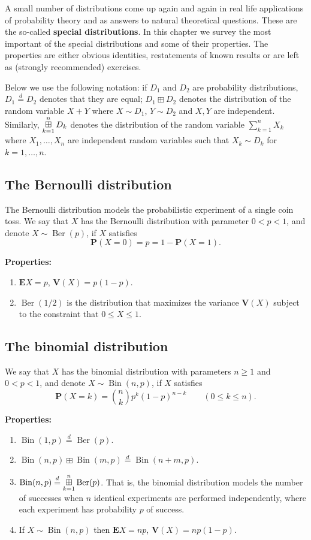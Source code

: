 \documentclass[12pt]{article}
\newcommand{\prob}{\mathbf{P}}
\newcommand{\expec}{\mathbf{E}}
\newcommand{\var}{\mathbf{V}}
\newcommand{\eqdist}{\stackrel{d}{=}}
\newcommand{\indplus}{\boxplus}
\newcommand{\indsum}{\displaystyle \mathop{\boxplus}\displaylimits}
\newcommand{\berdist}{\operatorname{Ber}}
\newcommand{\bindist}{\operatorname{Bin}}
\theoremstyle{example}
\begin{document}
A small number of distributions come up again and again in real life applications of probability theory and as answers to natural theoretical questions. These are the so-called \textbf{special distributions}. In this chapter we survey the most important of the special distributions and some of their properties. The properties are either obvious identities, restatements of known results or are left as  (strongly recommended) exercises.

Below we use the following notation: if $D_1$ and $D_2$ are probability distributions, $D_1 \eqdist D_2$ denotes that they are equal; $D_1\indplus D_2$ denotes the distribution of the random variable $X+Y$ where $X\sim D_1$, $Y\sim D_2$ and $X,Y$ are independent. Similarly, $\indsum_{k=1}^n D_k$ denotes the distribution of the random variable $\sum_{k=1}^n X_k$ where $X_1,\ldots,X_n$ are independent random variables such that $X_k \sim D_k$ for $k=1,\ldots,n$.

\subsection{The Bernoulli distribution}

The Bernoulli distribution models the probabilistic experiment of a single coin toss. We say that $X$ has the Bernoulli distribution with parameter $0<p<1$, and denote $X \sim \berdist(p)$, if $X$ satisfies
$$ \prob(X=0)=p = 1-\prob(X=1).$$

\noindent \textbf{Properties:}
\begin{enumerate}

\item $\expec X = p$, $\var(X) = p(1-p)$.
\item $\berdist(1/2)$ is the distribution that maximizes the variance $\var(X)$ subject to the constraint that $0\le X\le 1$.
\end{enumerate}

\subsection{The binomial distribution}

We say that $X$ has the binomial distribution with parameters $n\ge 1$ and $0<p<1$, and denote $X\sim \bindist(n,p)$, if $X$ satisfies
$$
\prob(X = k) = \binom{n}{k} p^k (1-p)^{n-k} \qquad (0\le k\le n).
$$

\noindent \textbf{Properties:}
\begin{enumerate}
\item $\bindist(1,p) \eqdist \berdist(p)$.
\item $\bindist(n,p) \indplus \bindist(m,p) \eqdist \bindist(n+m,p)$.
\item $\bindist(n,p) \eqdist \indsum_{k=1}^n \berdist(p)$. That is, the binomial distribution models the number of successes when $n$ identical experiments are performed independently, where each experiment has probability $p$ of success.
\item If $X\sim \bindist(n,p)$ then $\expec X = np$, $\var(X) = np(1-p)$.
\end{enumerate}
\end{document}
